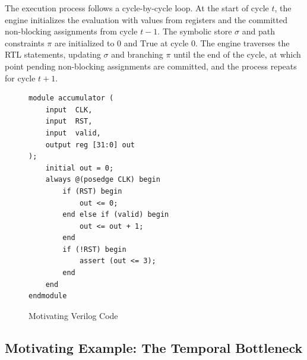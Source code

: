 \documentclass[conference]{IEEEtran}
\begin{document}
The execution process follows a cycle-by-cycle loop. At the start of cycle $t$, the engine initializes the evaluation with values from registers and the committed non-blocking assignments from cycle $t-1$. The symbolic store $\sigma$ and path constraints $\pi$ are initialized to $0$ and $\text{True}$ at cycle $0$. The engine traverses the RTL statements, updating $\sigma$ and branching $\pi$ until the end of the cycle, at which point pending non-blocking assignments are committed, and the process repeats for cycle $t+1$.

\begin{figure}[h!]
\begin{framed}
\begin{lstlisting}[caption={Accumulator used to illustrate temporal search difficulty.},label={lst:toy_acc}]
module accumulator (
    input  CLK,
    input  RST,
    input  valid,
    output reg [31:0] out
);
    initial out = 0;
    always @(posedge CLK) begin
        if (RST) begin
            out <= 0;
        end else if (valid) begin
            out <= out + 1;
        end
        if (!RST) begin
            assert (out <= 3);
        end
    end
endmodule
\end{lstlisting}
\end{framed}
\caption{Motivating Verilog Code}
\label{fig:verilog-fig}

\end{figure}


\subsection{Motivating Example: The Temporal Bottleneck}
\end{document}
